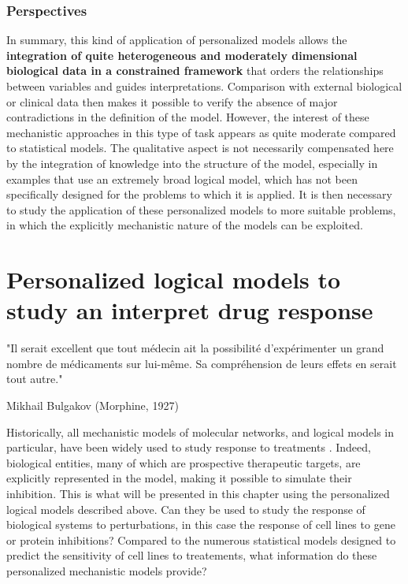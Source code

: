 \documentclass[a4paper,12pt,twoside,onecolumn,openright,final,oldfontcommands]{memoir}
\newcommand{\initial}[1]{
	\lettrine[lines=3,lhang=0.33,nindent=0em]{
		\color{gray}
     		{\textsc{#1}}}{}}
\begin{document}
\subsection{Perspectives}\label{perspectives}

In summary, this kind of application of personalized models allows the
\textbf{integration of quite heterogeneous and moderately dimensional
biological data in a constrained framework} that orders the
relationships between variables and guides interpretations. Comparison
with external biological or clinical data then makes it possible to
verify the absence of major contradictions in the definition of the
model. However, the interest of these mechanistic approaches in this
type of task appears as quite moderate compared to statistical models.
The qualitative aspect is not necessarily compensated here by the
integration of knowledge into the structure of the model, especially in
examples that use an extremely broad logical model, which has not been
specifically designed for the problems to which it is applied. It is
then necessary to study the application of these personalized models to
more suitable problems, in which the explicitly mechanistic nature of
the models can be exploited.

\chapter{Personalized logical models to study an interpret drug
response}\label{personalized-logical-models-to-study-an-interpret-drug-response}

\epigraph{"Il serait excellent que tout médecin ait la possibilité d'expérimenter un grand nombre de médicaments sur lui-même. Sa compréhension de leurs effets en serait tout autre."}{Mikhail Bulgakov (Morphine, 1927)}

\initial{H}istorically, all mechanistic models of molecular networks,
and logical models in particular, have been widely used to study
response to treatments
\citep{flobak2015discovery, jastrzebski2018integrative}. Indeed,
biological entities, many of which are prospective therapeutic targets,
are explicitly represented in the model, making it possible to simulate
their inhibition. This is what will be presented in this chapter using
the personalized logical models described above. Can they be used to
study the response of biological systems to perturbations, in this case
the response of cell lines to gene or protein inhibitions? Compared to
the numerous statistical models designed to predict the sensitivity of
cell lines to treatements, what information do these personalized
mechanistic models provide?
\end{document}
